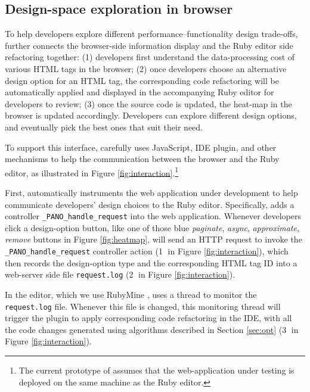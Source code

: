 \subsection{Design-space exploration in browser}
To help developers explore different
performance--functionality design trade-offs, \Tool further
connects the browser-side information display and the Ruby editor side
refactoring together:
(1) developers first understand the data-processing cost 
of various HTML tags in the browser; 
(2) once developers choose an alternative design option for an HTML tag, 
the corresponding code refactoring will be automatically applied and displayed 
in the accompanying Ruby editor for developers to review; 
(3) once the source code is updated, the heat-map in the browser is
updated accordingly. Developers can explore different
design options, and eventually pick the best ones that suit their need.

To support this interface, \Tool carefully uses JavaScript, IDE plugin, and
other mechanisms
to help the communication between the browser and the Ruby editor, as illustrated
in Figure \ref{fig:interaction}.\footnote{The current prototype of \Tool assumes that the web-application under testing is deployed
on the same machine as the Ruby editor.}

First, \Tool automatically instruments the web application under development to help
communicate developers' design choices to the Ruby editor. Specifically, \Tool
adds a controller {\tt \_PANO\_handle\_request}
into the web application. Whenever developers click a design-option button,
like one of those blue {\it paginate}, {\it async}, {\it approximate},
{\it remove} buttons in Figure \ref{fig:heatmap}, 
\Tool
will send an HTTP request to invoke the {\tt \_PANO\_handle\_request} 
controller action ({\large \textcircled{\small 1}}  in Figure \ref{fig:interaction}), 
which then records the design-option type and the corresponding
HTML tag ID into a web-server side file {\tt request.log} ({\large \textcircled{\small 2}} in Figure \ref{fig:interaction}). 

In the editor, which we use RubyMine \cite{rubymine}, \Tool 
uses a thread to monitor the {\tt request.log} file.
Whenever this file is changed, this monitoring thread will trigger the 
plugin to apply corresponding code refactoring in the IDE, with all the
code changes generated using algorithms described in Section \ref{sec:opt}
({\large \textcircled{\small 3}}  in Figure \ref{fig:interaction}). 

